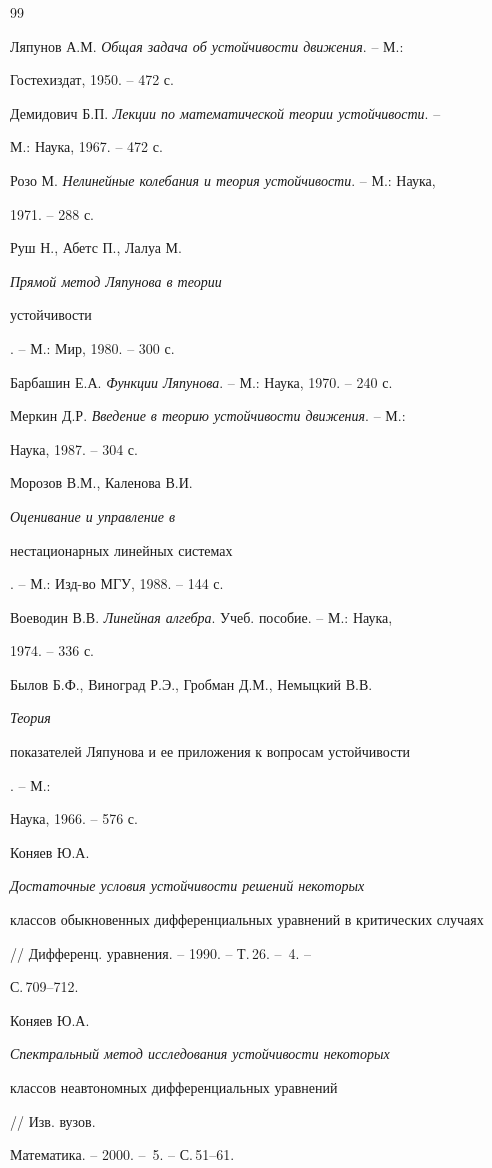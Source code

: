 \begin{thebibliography}{99}







Ляпунов А.М. {\em Общая задача об устойчивости движения}. -- М.: 


Гостехиздат, 1950. -- 472 с.




Демидович Б.П. {\em Лекции по математической теории устойчивости}. -- 


М.: Наука, 1967. -- 472 с.




Розо М. {\em Нелинейные колебания и теория устойчивости}. -- М.: Наука, 


1971. -- 288 с.




Руш Н., Абетс П., Лалуа М. {\em Прямой метод Ляпунова в теории 


устойчивости}. -- М.: Мир, 1980. -- 300 с.




Барбашин Е.А. {\em Функции Ляпунова}. -- М.: Наука, 1970. -- 240 с.




Меркин Д.Р. {\em Введение в теорию устойчивости движения}. -- М.: 


Наука, 1987. -- 304 с.




Морозов В.М., Каленова В.И. {\em Оценивание и управление в 


нестационарных линейных системах}. -- М.: Изд-во МГУ, 1988. -- 144 с.




Воеводин В.В. {\em Линейная алгебра}. Учеб. пособие. -- М.: Наука, 


1974. -- 336 с.




Былов Б.Ф., Виноград Р.Э., Гробман Д.М., Немыцкий В.В. {\em Теория 


показателей Ляпунова и ее приложения к вопросам устойчивости}. -- М.: 


Наука, 1966. -- 576 с.




Коняев Ю.А. {\em Достаточные условия устойчивости решений некоторых 


классов обыкновенных дифференциальных уравнений в критических случаях} 


// Дифференц. уравнения. -- 1990. -- Т.\,26. -- \No\,4. -- 


С.\,709--712.




Коняев Ю.А. {\em Спектральный метод исследования устойчивости некоторых 


классов неавтономных дифференциальных уравнений} // Изв. вузов. 


Математика. -- 2000. -- \No\,5. -- С.\,51--61.








\end{thebibliography}
